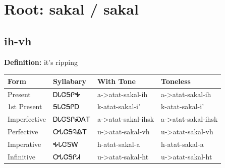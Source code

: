 \documentclass{article}%
\begin{document}
%
\normalsize%
\section*{Root: sakal / sakal}%
\subsection*{ih-vh}%
\textbf{Definition: }%
it’s ripping%
\\[0.5em]%
\begin{tabular}{|l|l|l|l|}%
\hline%
\textbf{Form}&\textbf{Syllabary}&\textbf{With Tone}&\textbf{Toneless}\\%
\hline%
Present&ᎠᏓᏣᎦᎵᎭ&a{-}>atat{-}sakal{-}ih&a{-}>atat{-}sakal{-}ih\\%
1st Present&ᎦᏓᏣᎦᎵᎠ&k{-}atat{-}sakal{-}i'&k{-}atat{-}sakal{-}i'\\%
Imperfective&ᎠᏓᏣᎦᎵᏍᎪᎢ&a{-}>atat{-}sakal{-}ihsk&a{-}>atat{-}sakal{-}ihsk\\%
Perfective&ᎤᏓᏣᎦᎸᎲᎢ&u{-}>atat{-}sakal{-}vh&u{-}>atat{-}sakal{-}vh\\%
Imperative&ᎭᏓᏣᎦᎳ&h{-}atat{-}sakal{-}a&h{-}atat{-}sakal{-}a\\%
Infinitive&ᎤᏓᏣᎦᎵᏗ&u{-}>atat{-}sakal{-}ht&u{-}>atat{-}sakal{-}ht\\%
\hline%
\end{tabular}%
\\[1em]%
\end{document}
